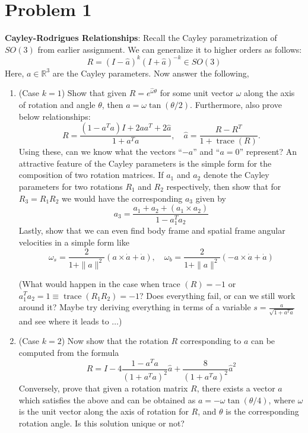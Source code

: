 \section*{Problem 1}
\setcounter{section}{1}
\setcounter{equation}{0}

\textbf{Cayley-Rodrigues Relationships}:
Recall the Cayley parametrization of \( S O(3) \) from earlier assignment.
We can generalize it to higher orders as follows:
\[
    R=(I-\widehat{a})^{k}(I+\widehat{a})^{-k} \in S O(3)
\]
Here, \( a \in \mathbb{R}^{3} \) are the Cayley parameters.
Now answer the following,
\begin{enumerate}[label= (\alph*)]
    \item (Case \( k=1 \))
          Show that given \( R=e^{\widehat{\omega} \theta} \) for some unit vector \( \omega \) along the axis of rotation and angle \( \theta \), then \( a=\omega \tan (\theta / 2) \).
          Furthermore, also prove below relationships:
          \[
              R=\frac{\left(1-a^{T} a\right) I+2 a a^{T}+2 \widehat{a}}{1+a^{T} a}, \quad \widehat{a}=\frac{R-R^{T}}{1+\operatorname{trace}(R)} .
          \]
          Using these, can we know what the vectors ``\( -a \)'' and ``\( a=0 \)'' represent?
          An attractive feature of the Cayley parameters is the simple form for the composition of two rotation matrices.
          If \( a_{1} \) and \( a_{2} \) denote the Cayley parameters for two rotations \( R_{1} \) and \( R_{2} \) respectively, then show that for \( R_{3}=R_{1} R_{2} \) we would have the corresponding \( a_{3} \) given by
          \[
              a_{3}=\frac{a_{1}+a_{2}+\left(a_{1} \times a_{2}\right)}{1-a_{1}^{T} a_{2}}
          \]
          Lastly, show that we can even find body frame and spatial frame angular velocities in a simple form like
          \[
              \omega_{s}=\frac{2}{1+\|a\|^{2}}(a \times \dot{a}+\dot{a}), \quad \omega_{b}=\frac{2}{1+\|a\|^{2}}(-a \times \dot{a}+\dot{a})
          \]

          (What would happen in the case when trace \( (R)=-1 \) or \( a_{1}^{T} a_{2}=1 \equiv \operatorname{trace}\left(R_{1} R_{2}\right)=-1 \)?
          Does everything fail, or can we still work around it?
          Maybe try deriving everything in terms of a variable \( s=\frac{a}{\sqrt{1+a^{T} a}} \) and see where it leads to \( \ldots \))

    \item (Case \( k=2 \)) Now show that the rotation \( R \) corresponding to \( a \) can be computed from the formula
          \[
              R=I-4 \frac{1-a^{T} a}{\left(1+a^{T} a\right)^{2}} \widehat{a}+\frac{8}{\left(1+a^{T} a\right)^{2}} \widehat{a}^{2}
          \]
          Conversely, prove that given a rotation matrix \( R \), there exists a vector \( a \) which satisfies the above and can be obtained as \( a=-\omega \tan (\theta / 4) \), where \( \omega \) is the unit vector along the axis of rotation for \( R \), and \( \theta \) is the corresponding rotation angle.
          Is this solution unique or not?


\end{enumerate}
